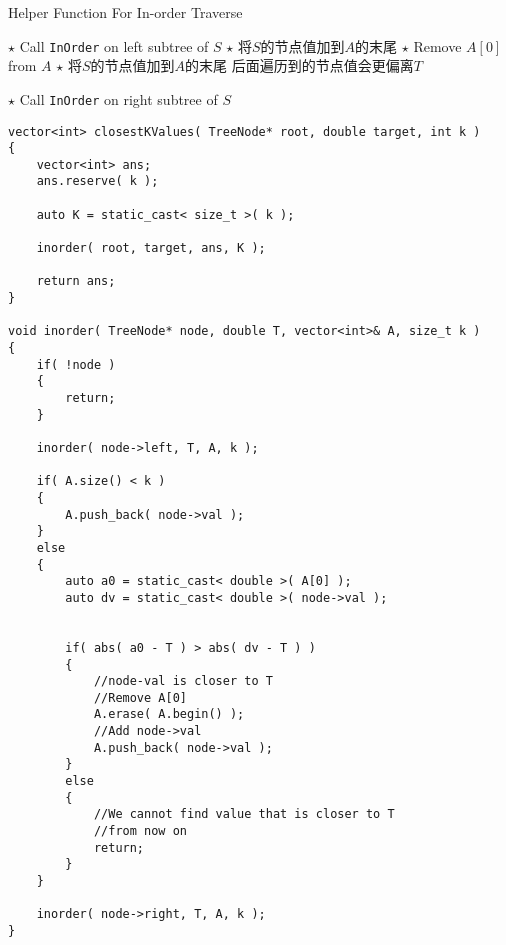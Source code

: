 \begin{algorithm}[H]
\caption{Helper Function For In-order Traverse}
\begin{algorithmic}[1]
\State \Return
\EndIf
\State $\star$ Call \texttt{InOrder} on left subtree of $S$
\State $\star$ 将$S$的节点值加到$A$的末尾
\Else
{}
\State $\star$ Remove $A[0]$ from $A$
\State $\star$ 将$S$的节点值加到$A$的末尾
\Else
\State \Return \Comment 后面遍历到的节点值会更偏离$T$
\end{algorithmic}
\end{algorithm}
\begin{algorithm}[H]
\begin{algorithmic}[1]
\EndIf
\EndIf
\State $\star$ Call \texttt{InOrder} on right subtree of $S$
\EndProcedure
\end{algorithmic}
\end{algorithm}
\setcounter{lstlisting}{0}
\begin{lstlisting}[style=customc,caption={In-order Traverse}]
vector<int> closestKValues( TreeNode* root, double target, int k )
{
    vector<int> ans;
    ans.reserve( k );

    auto K = static_cast< size_t >( k );

    inorder( root, target, ans, K );

    return ans;
}

void inorder( TreeNode* node, double T, vector<int>& A, size_t k )
{
    if( !node )
    {
        return;
    }

    inorder( node->left, T, A, k );

    if( A.size() < k )
    {
        A.push_back( node->val );
    }
    else
    {
        auto a0 = static_cast< double >( A[0] );
        auto dv = static_cast< double >( node->val );


        if( abs( a0 - T ) > abs( dv - T ) )
        {
            //node-val is closer to T
            //Remove A[0]
            A.erase( A.begin() );
            //Add node->val
            A.push_back( node->val );
        }
        else
        {
            //We cannot find value that is closer to T
            //from now on
            return;
        }
    }

    inorder( node->right, T, A, k );
}
\end{lstlisting}
